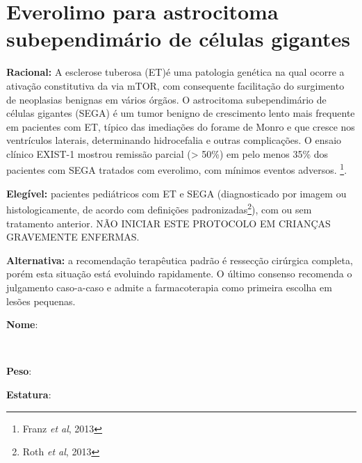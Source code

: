 \documentclass[11pt,a4paper,oldfontcommands]{memoir}
\def\entrywithlabel[#1]#2{\parbox{#1}{{\small #2:} \hrulefill}}
\begin{document}
\section{Everolimo para astrocitoma subependimário de células gigantes}
{\let\thefootnote\relax{}}

\textbf{Racional:} A esclerose tuberosa (ET)é uma patologia genética na qual ocorre a ativação constitutiva da via mTOR, com consequente facilitação do surgimento de neoplasias benignas em vários órgãos. O astrocitoma subependimário de células gigantes (SEGA) é um tumor benigno de crescimento lento mais frequente em pacientes com ET, típico das imediações do forame de Monro e que cresce nos ventrículos laterais, determinando hidrocefalia e outras complicações. O ensaio clínico EXIST-1 mostrou remissão parcial (> 50\%) em pelo menos 35\% dos pacientes com SEGA tratados com everolimo, com mínimos eventos adversos. \footnote{Franz \textit{et al}, 2013}.

\textbf{Elegível:} pacientes pediátricos com ET e SEGA (diagnosticado por imagem ou histologicamente, de acordo com definições padronizadas\footnote{Roth \textit{et al}, 2013}), com ou sem tratamento anterior. NÃO INICIAR ESTE PROTOCOLO EM CRIANÇAS GRAVEMENTE ENFERMAS.

\textbf{Alternativa:} a recomendação terapêutica padrão é ressecção cirúrgica completa, porém esta situação está evoluindo rapidamente. O último consenso recomenda o julgamento caso-a-caso e admite a farmacoterapia como primeira escolha em lesões pequenas.
\\[0.4cm]
\entrywithlabel[1\hsize]{\textbf{Nome}}\hfill
\\[0.3cm]
\entrywithlabel[.45\hsize]{\textbf{Peso}}\hfill  \entrywithlabel[.45\hsize]{\textbf{Estatura}}
\end{document}
